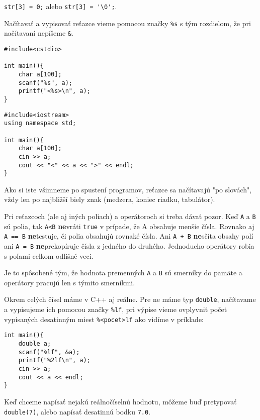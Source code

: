\riesenie \verb!str[3] = 0;! alebo \verb!str[3] = '\0';!.

\medskip

Načítavať a vypisovať reťazce vieme pomocou značky \verb!%s! s tým rozdielom,
že pri načítavaní nepíšeme \verb!&!.

\begin{lstlisting}
#include<cstdio>

int main(){
    char a[100];
    scanf("%s", a);
    printf("<%s>\n", a);
}
\end{lstlisting}
\begin{lstlisting}
#include<iostream>
using namespace std;

int main(){
    char a[100];
    cin >> a;
    cout << "<" << a << ">" << endl;
}
\end{lstlisting}

Ako si iste všimneme po spustení programov, reťazce sa načítavajú "po slovách",
vždy len po najbližší biely znak (medzera, koniec riadku, tabulátor).

\medskip

Pri reťazcoch (ale aj iných poliach) a operátoroch si treba dávať pozor.  Keď
\verb!A! a \verb!B! sú polia, tak \verb!A<B! \textbf{ne}vráti \verb!true! v
prípade, že A obsahuje menšie čísla. Rovnako aj \verb!A == B! \textbf{ne}testuje,
či polia obsahujú rovnaké čísla. Ani \verb!A + B! \textbf{ne}sčíta obsahy polí
ani \verb!A = B!  \textbf{ne}prekopíruje čísla z jedného do druhého. Jednoducho
operátory robia s poľami celkom odlišné veci.

Je to spôsobené tým, že hodnota premenných \verb!A! a \verb!B! sú smerníky do
pamäte a operátory pracujú len s týmito smerníkmi.


Okrem celých čísel máme v C++ aj reálne. Pre ne máme typ
\verb!double!, načítavame a vypisujeme ich pomocou značky \verb"%lf",
pri výpise vieme ovplyvniť počet vypísaných desatinným miest \verb"%<pocet>lf"
ako vidíme v príklade:

\begin{lstlisting}
int main(){
    double a;
    scanf("%lf", &a);
    printf("%2lf\n", a);
    cin >> a;
    cout << a << endl;
}
\end{lstlisting}

Keď chceme napísať nejakú reálnočíselnú hodnotu, môžeme buď pretypovať
\verb!double(7)!, alebo napísať desatinnú bodku \verb!7.0!.

\medskip

